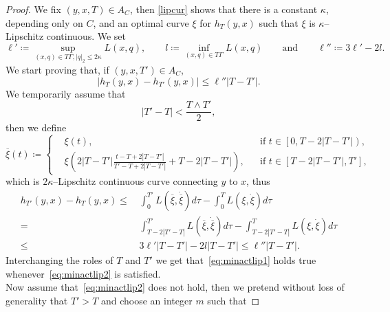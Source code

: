 \documentclass[10pt,a4paper]{amsart}
\newcommand{\ovxi}{\overline\xi}
\begin{document}
    \begin{proof}
        We fix $(y,x,T)\in A_C$, then \cref{lipcur} shows that there is a constant $\kappa$, depending only on $C$, and an optimal curve $\xi$ for $h_T(y,x)$ such that $\xi$ is $\kappa$--Lipschitz continuous. We set
        \begin{equation*}
            \ell'\coloneqq\sup_{(x,q)\in T\Gamma,|q|_2\le2\kappa}L(x,q),\qquad l\coloneqq\inf_{(x,q)\in T\Gamma}L(x,q)\qquad\text{and}\qquad\ell''\coloneqq3\ell'-2l.
        \end{equation*}
        We start proving that, if $(y,x,T')\in A_C$,
        \begin{equation}\label{eq:minactlip1}
            |h_T(y,x)-h_{T'}(y,x)|\le\ell''\left|T-T'\right|.
        \end{equation}
        We temporarily assume that
        \begin{equation}\label{eq:minactlip2}
            \left|T'-T\right|<\frac{T\wedge T'}2,
        \end{equation}
        then we define
        \begin{equation*}
            \ovxi(t)\coloneqq\left\{
            \begin{aligned}
                &\xi(t),&&\text{if }t\in\left[0,T-2\left|T-T'\right|\right),\\
                &\xi\left(2\left|T-T'\right|\frac{t-T+2|T-T'|}{T'-T+2|T-T'|}+T-2\left|T-T'\right|\right),&&\text{if }t\in\left[T-2\left|T-T'\right|,T'\right],
            \end{aligned}
            \right.
        \end{equation*}
        which is $2\kappa$--Lipschitz continuous curve connecting $y$ to $x$, thus
        \begin{align*}
            h_{T'}(y,x)-h_T(y,x)\le\,&\int_0^{T'}L\left(\ovxi,\dot\ovxi\right)d\tau-\int_0^T L\left(\xi,\dot\xi\right)d\tau\\
            =\,&\int_{T-2|T'-T|}^{T'}L\left(\ovxi,\dot\ovxi\right)d\tau-\int_{T-2|T'-T|}^T L\left(\xi,\dot\xi\right)d\tau\\
            \le\,&3\ell'\left|T-T'\right|-2l\left|T-T'\right|\le\ell''\left|T-T'\right|.
        \end{align*}
        Interchanging the roles of $T$ and $T'$ we get that~\cref{eq:minactlip1} holds true whenever~\cref{eq:minactlip2} is satisfied.\\
        Now assume that~\cref{eq:minactlip2} does not hold, then we pretend without loss of generality that $T'>T$ and choose an integer $m$ such that

\end{proof}
\end{document}
